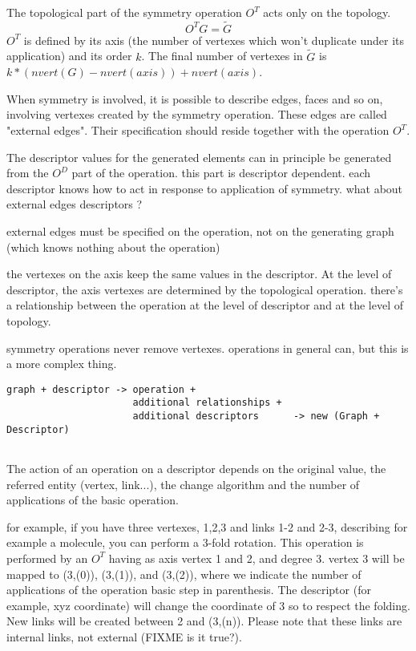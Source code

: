 \documentclass[a4paper,12pt,oneside]{book}
\begin{document}
The topological part of the symmetry operation $O^{T}$ acts only on the topology.
\begin{equation}
O^{T} G = \tilde{G}
\end{equation}
$O^{T}$ is defined by its axis (the number of vertexes which won't duplicate
under its application) and its order $k$. The final number of vertexes in
$\tilde{G}$ is $ k*(nvert(G) - nvert(axis)) + nvert(axis)$.

When symmetry is involved, it is possible to describe edges, faces and so
on, involving vertexes created by the symmetry operation. These edges are
called "external edges". Their specification should reside together with the
operation $O^{T}$.

The descriptor values for the generated elements can in principle be
generated from the $O^{D}$ part of the operation. this part is descriptor
dependent. each descriptor knows how to act in response to application of
symmetry. what about external edges descriptors ?


external edges must be specified on the operation, not on the generating
graph (which knows nothing about the operation)

the vertexes on the axis keep the same values in the descriptor.
At the level of descriptor, the axis vertexes are determined by the
topological operation. there's a relationship between the operation at the
level of descriptor and at the level of topology.

symmetry operations never remove vertexes. operations in general can, but
this is a more complex thing.



\begin{verbatim}
graph + descriptor -> operation + 
                      additional relationships + 
                      additional descriptors      -> new (Graph + Descriptor)
                                                  
\end{verbatim}

The action of an operation on a descriptor depends on the original value,
the referred entity (vertex, link...), the change algorithm and the number
of applications of the basic operation.

for example, if you have three vertexes, 1,2,3 and links 1-2 and 2-3,
describing for example a molecule, you can perform a 3-fold rotation. This
operation is performed by an $O^{T}$ having as axis vertex 1 and 2, and
degree 3. vertex 3 will be mapped to (3,(0)), (3,(1)), and (3,(2)), where we
indicate the number of applications of the operation basic step in
parenthesis. The descriptor (for example, xyz coordinate) will change the
coordinate of 3 so to respect the folding. New links will be created between
2 and (3,(n)). Please note that these links are internal links, not
external (FIXME is it true?).
\end{document}
